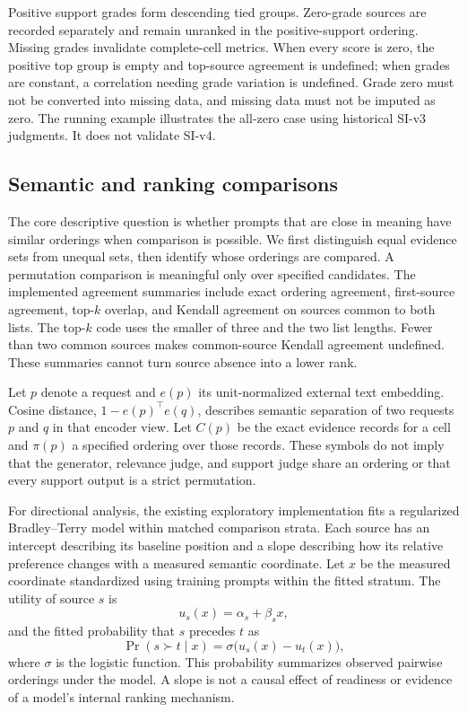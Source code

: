 Positive support grades form descending tied groups. Zero-grade sources are recorded separately and remain unranked in the positive-support ordering. Missing grades invalidate complete-cell metrics. When every score is zero, the positive top group is empty and top-source agreement is undefined; when grades are constant, a correlation needing grade variation is undefined. Grade zero must not be converted into missing data, and missing data must not be imputed as zero. The running example illustrates the all-zero case using historical SI-v3 judgments. It does not validate SI-v4.

\subsection{Semantic and ranking comparisons}
\label{sec:analysis}
The core descriptive question is whether prompts that are close in meaning have similar orderings when comparison is possible. We first distinguish equal evidence sets from unequal sets, then identify whose orderings are compared. A permutation comparison is meaningful only over specified candidates. The implemented agreement summaries include exact ordering agreement, first-source agreement, top-$k$ overlap, and Kendall agreement on sources common to both lists. The top-$k$ code uses the smaller of three and the two list lengths. Fewer than two common sources makes common-source Kendall agreement undefined. These summaries cannot turn source absence into a lower rank.

Let $p$ denote a request and $e(p)$ its unit-normalized external text embedding. Cosine distance, $1-e(p)^\top e(q)$, describes semantic separation of two requests $p$ and $q$ in that encoder view. Let $C(p)$ be the exact evidence records for a cell and $\pi(p)$ a specified ordering over those records. These symbols do not imply that the generator, relevance judge, and support judge share an ordering or that every support output is a strict permutation. 

For directional analysis, the existing exploratory implementation fits a regularized Bradley--Terry model within matched comparison strata. Each source has an intercept describing its baseline position and a slope describing how its relative preference changes with a measured semantic coordinate. Let $x$ be the measured coordinate standardized using training prompts within the fitted stratum. The utility of source $s$ is
\begin{equation}
 u_s(x)=\alpha_s+\beta_s x,
\label{eq:utility}
\end{equation}
and the fitted probability that $s$ precedes $t$ as
\begin{equation}
 \Pr(s\succ t\mid x)=\sigma\bigl(u_s(x)-u_t(x)\bigr),
\label{eq:bt}
\end{equation}
where $\sigma$ is the logistic function. This probability summarizes observed pairwise orderings under the model. A slope is not a causal effect of readiness or evidence of a model's internal ranking mechanism.

